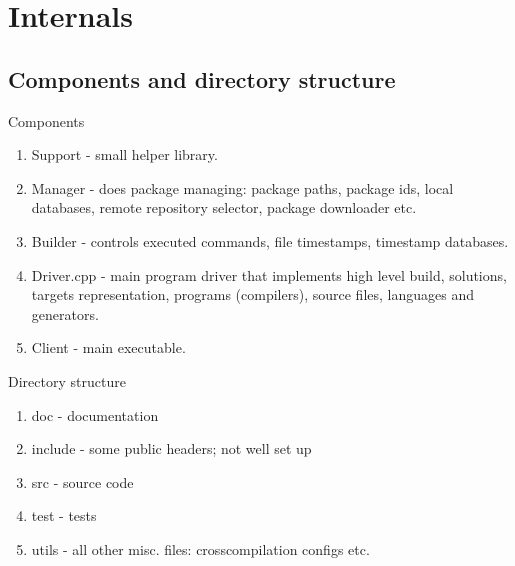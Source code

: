 \section{Internals}
\subsection{Components and directory structure}

Components

\begin{enumerate}
\item
Support - small helper library.
\item
Manager - does package managing: package paths, package ids, local databases, remote repository selector, package downloader etc.
\item
Builder - controls executed commands, file timestamps, timestamp databases.
\item
Driver.cpp - main program driver that implements high level build, solutions, targets representation, programs (compilers), source files, languages and generators.
\item
Client - main executable.
\end{enumerate}

Directory structure

\begin{enumerate}
\item
doc - documentation
\item
include - some public headers; not well set up
\item
src - source code
\item
test - tests
\item
utils - all other misc. files: crosscompilation configs etc.
\end{enumerate}
